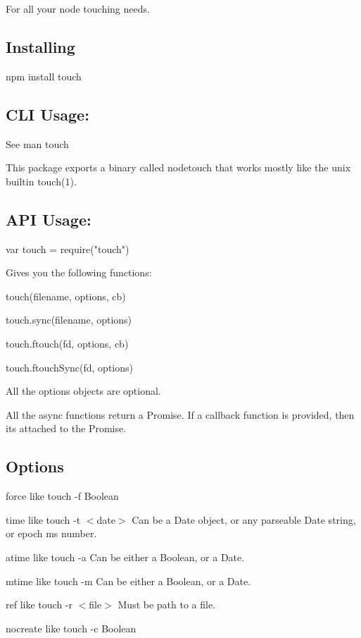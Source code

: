 For all your node touching needs.

\subsection*{Installing}


\begin{DoxyCode}
npm install touch
\end{DoxyCode}


\subsection*{C\+LI Usage\+:}

See {\ttfamily man touch}

This package exports a binary called {\ttfamily nodetouch} that works mostly like the unix builtin {\ttfamily touch(1)}.

\subsection*{A\+PI Usage\+:}


\begin{DoxyCode}
var touch = require("touch")
\end{DoxyCode}


Gives you the following functions\+:


\begin{DoxyItemize}
\item {\ttfamily touch(filename, options, cb)}
\item {\ttfamily touch.\+sync(filename, options)}
\item {\ttfamily touch.\+ftouch(fd, options, cb)}
\item {\ttfamily touch.\+ftouch\+Sync(fd, options)}
\end{DoxyItemize}

All the {\ttfamily options} objects are optional.

All the async functions return a Promise. If a callback function is provided, then it\textquotesingle{}s attached to the Promise.

\subsection*{Options}


\begin{DoxyItemize}
\item {\ttfamily force} like {\ttfamily touch -\/f} Boolean
\item {\ttfamily time} like {\ttfamily touch -\/t $<$date$>$} Can be a Date object, or any parseable Date string, or epoch ms number.
\item {\ttfamily atime} like {\ttfamily touch -\/a} Can be either a Boolean, or a Date.
\item {\ttfamily mtime} like {\ttfamily touch -\/m} Can be either a Boolean, or a Date.
\item {\ttfamily ref} like {\ttfamily touch -\/r $<$file$>$} Must be path to a file.
\item {\ttfamily nocreate} like {\ttfamily touch -\/c} Boolean
\end{DoxyItemize}

